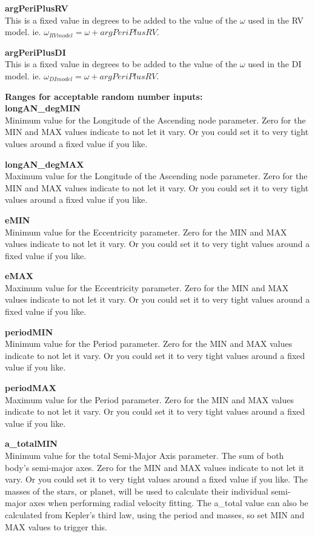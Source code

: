\documentclass[12pt,preprint]{aastex}
\begin{document}
{\bf argPeriPlusRV}\\
This is a fixed value in degrees to be added to the value of the $\omega$ used in the RV model. ie. $\omega_{RVmodel}=\omega+argPeriPlusRV$.

{\bf argPeriPlusDI}\\
This is a fixed value in degrees to be added to the value of the $\omega$ used in the DI model. ie. $\omega_{DImodel}=\omega+argPeriPlusRV$.

{\bf \color{blue} Ranges for acceptable random number inputs: }\\
{\bf longAN\_degMIN}\\
Minimum value for the Longitude of the Ascending node parameter.
Zero for the MIN and MAX values indicate to not let it vary.  Or you could set it to very tight values around a fixed value if you like.

{\bf longAN\_degMAX}\\
Maximum value for the Longitude of the Ascending node parameter.
Zero for the MIN and MAX values indicate to not let it vary.  Or you could set it to very tight values around a fixed value if you like.

{\bf eMIN}\\
Minimum value for the Eccentricity parameter.
Zero for the MIN and MAX values indicate to not let it vary.  Or you could set it to very tight values around a fixed value if you like.

{\bf eMAX}\\
Maximum value for the Eccentricity parameter.
Zero for the MIN and MAX values indicate to not let it vary.  Or you could set it to very tight values around a fixed value if you like.

{\bf periodMIN}\\
Minimum value for the Period parameter.
Zero for the MIN and MAX values indicate to not let it vary.  Or you could set it to very tight values around a fixed value if you like.

{\bf periodMAX}\\
Maximum value for the Period parameter.
Zero for the MIN and MAX values indicate to not let it vary.  Or you could set it to very tight values around a fixed value if you like.

{\bf a\_totalMIN}\\
Minimum value for the total Semi-Major Axis parameter.  The sum of both body's semi-major axes.
Zero for the MIN and MAX values indicate to not let it vary.  Or you could set it to very tight values around a fixed value if you like.  The masses of the stars, or planet, will be used to calculate their individual semi-major axes when performing radial velocity fitting.  The a\_total value can also be calculated from Kepler's third law, using the period and masses, so set MIN and MAX values to trigger this. 
\end{document}
